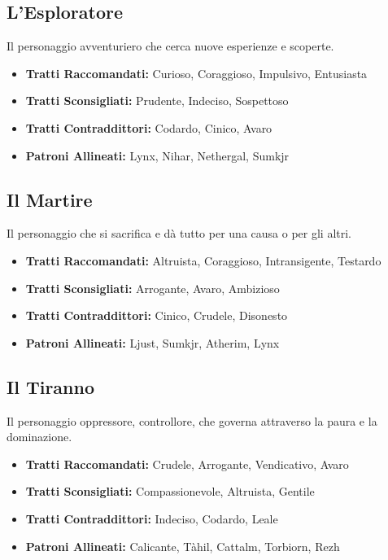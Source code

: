 \begin{multicols}{2}
\subsection*{L'Esploratore}
Il personaggio avventuriero che cerca nuove esperienze e scoperte.

\noindent\begin{itemize}[leftmargin=*] \setlength{\itemsep}{0pt}
\item \textbf{Tratti Raccomandati:} Curioso, Coraggioso, Impulsivo, Entusiasta
\item \textbf{Tratti Sconsigliati:} Prudente, Indeciso, Sospettoso
\item \textbf{Tratti Contraddittori:} Codardo, Cinico, Avaro
\item \textbf{Patroni Allineati:} Lynx, Nihar, Nethergal, Sumkjr
\end{itemize}

\subsection*{Il Martire}
Il personaggio che si sacrifica e dà tutto per una causa o per gli altri.

\noindent\begin{itemize}[leftmargin=*] \setlength{\itemsep}{0pt}
\item \textbf{Tratti Raccomandati:} Altruista, Coraggioso, Intransigente, Testardo
\item \textbf{Tratti Sconsigliati:} Arrogante, Avaro, Ambizioso
\item \textbf{Tratti Contraddittori:} Cinico, Crudele, Disonesto
\item \textbf{Patroni Allineati:} Ljust, Sumkjr, Atherim, Lynx
\end{itemize}

\subsection*{Il Tiranno}
Il personaggio oppressore, controllore, che governa attraverso la paura e la dominazione.

\noindent\begin{itemize}[leftmargin=*] \setlength{\itemsep}{0pt}
\item \textbf{Tratti Raccomandati:} Crudele, Arrogante, Vendicativo, Avaro
\item \textbf{Tratti Sconsigliati:} Compassionevole, Altruista, Gentile
\item \textbf{Tratti Contraddittori:} Indeciso, Codardo, Leale
\item \textbf{Patroni Allineati:} Calicante, Tàhil, Cattalm, Torbiorn, Rezh
\end{itemize}


\end{multicols}
